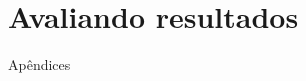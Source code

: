 \documentclass[
12pt,				%
openright,			%
twoside,			%
a4paper,			%
english,			%
french,				%
spanish,			%
brazil				%
]{abntex2}
\begin{document}
\section{Avaliando resultados}		
\postextual



%
%


Apêndices

\printindex
\end{document}
